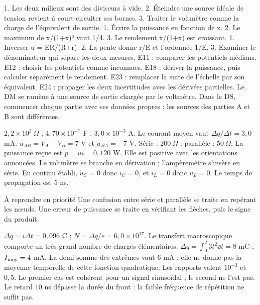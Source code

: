 1. Les deux milieux sont des diviseurs à vide. 2. Éteindre une source idéale de tension revient à court-circuiter ses bornes. 3. Traiter le voltmètre comme la charge de l’équivalent de sortie.
1. Écrire la puissance en fonction de x. 2. Le maximum de x/(1+x)² vaut 1/4. 3. Le rendement x/(1+x) est croissant.
1. Inverser u = ER/(R+r). 2. La pente donne r/E et l’ordonnée 1/E. 3. Examiner le dénominateur qui sépare les deux mesures.
E11 : comparer les potentiels médians. E12 : choisir les potentiels comme inconnues. E18 : dériver la puissance, puis calculer séparément le rendement. E23 : remplacer la suite de l’échelle par son équivalent. E24 : propager les deux incertitudes avec les dérivées partielles.
Le DM se ramène à une source de sortie chargée par le voltmètre. Dans le DS, commencer chaque partie avec ses données propres ; les sources des parties A et B sont différentes.


$2{,}2\times10^3\ \Omega$ ; $4{,}70\times10^{-7}$ F ; $3{,}0\times10^{-3}$ A. Le courant moyen vaut $\Delta q/\Delta t=3{,}0$ mA. $u_{AB}=V_A-V_B=7$ V et $u_{BA}=-7$ V.
Série : $200\ \Omega$ ; parallèle : $50\ \Omega$. La puissance reçue est $p=ui=0{,}120$ W. Elle est positive avec les orientations annoncées.
Le voltmètre se branche en dérivation ; l’ampèremètre s’insère en série. En continu établi, $\dot u_C=0$ donc $i_C=0$, et $\dot i_L=0$ donc $u_L=0$. Le temps de propagation est $5$ ns.
\begin{methode}{À reprendre en priorité}
Une confusion entre série et parallèle se traite en repérant les nœuds. Une erreur de puissance se traite en vérifiant les flèches, puis le signe du produit.
\end{methode}


$\Delta q=i\Delta t=0{,}096$ C ; $N=\Delta q/e=6{,}0\times10^{17}$. Le transfert macroscopique comporte un très grand nombre de charges élémentaires.
$\Delta q=\int_0^2 3t^2\dd t=8$ mC ; $I_{\rm moy}=4$ mA. La demi-somme des extrêmes vaut $6$ mA : elle ne donne pas la moyenne temporelle de cette fonction quadratique.
Les rapports valent $10^{-3}$ et $0{,}5$. Le premier cas est cohérent pour un signal sinusoïdal ; le second ne l’est pas. Le retard $10$ ns dépasse la durée du front : la faible fréquence de répétition ne suffit pas.


